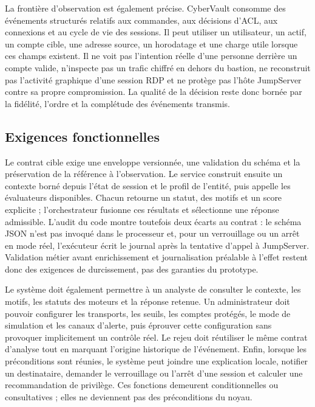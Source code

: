 \documentclass[11pt,a4paper,oneside]{report}
\theoremstyle{definition}
\theoremstyle{plain}
\begin{document}
La frontière d'observation est également précise. CyberVault consomme des
événements structurés relatifs aux commandes, aux décisions d'ACL, aux
connexions et au cycle de vie des sessions. Il peut utiliser un utilisateur, un
actif, un compte cible, une adresse source, un horodatage et une charge utile
lorsque ces champs existent. Il ne voit pas l'intention réelle d'une personne
derrière un compte valide, n'inspecte pas un trafic chiffré en dehors du
bastion, ne reconstruit pas l'activité graphique d'une session RDP et ne protège
pas l'hôte JumpServer contre sa propre compromission. La qualité de la décision
reste donc bornée par la fidélité, l'ordre et la complétude des événements
transmis.

\subsection{Exigences fonctionnelles}

Le contrat cible exige une enveloppe versionnée, une validation du schéma et
la préservation de la référence à l'observation. Le service construit ensuite
un contexte borné depuis l'état de session et le profil de l'entité, puis
appelle les évaluateurs disponibles. Chacun retourne un statut, des motifs et
un score explicite ; l'orchestrateur fusionne ces résultats et sélectionne une
réponse admissible. L'audit du code montre toutefois deux écarts au contrat :
le schéma JSON n'est pas invoqué dans le processeur et, pour un verrouillage ou
un arrêt en mode réel, l'exécuteur écrit le journal après la tentative d'appel
à JumpServer. Validation métier avant enrichissement et journalisation
préalable à l'effet restent donc des exigences de durcissement, pas des
garanties du prototype.

Le système doit également permettre à un analyste de consulter le contexte,
les motifs, les statuts des moteurs et la réponse retenue. Un administrateur
doit pouvoir configurer les transports, les seuils, les comptes protégés, le
mode de simulation et les canaux d'alerte, puis éprouver cette configuration
sans provoquer implicitement un contrôle réel. Le rejeu doit réutiliser le
même contrat d'analyse tout en marquant l'origine historique de l'événement.
Enfin, lorsque les préconditions sont réunies, le système peut joindre une
explication locale, notifier un destinataire, demander le verrouillage ou
l'arrêt d'une session et calculer une recommandation de privilège. Ces
fonctions demeurent conditionnelles ou consultatives ; elles ne deviennent
pas des préconditions du noyau.
\end{document}
